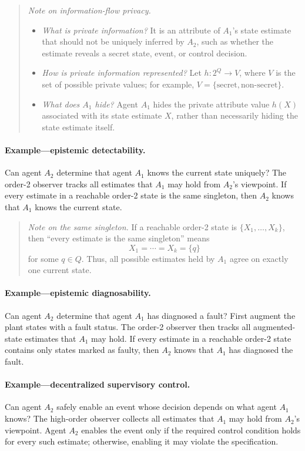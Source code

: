 \documentclass[11pt]{article}
\begin{document}
\begin{quote}
\textit{Note on information-flow privacy.}
\begin{itemize}
\item \textit{What is private information?} It is an attribute of $A_1$'s state estimate that should not be uniquely inferred by $A_2$, such as whether the estimate reveals a secret state, event, or control decision.
\item \textit{How is private information represented?} Let $h:2^Q\rightarrow V$, where $V$ is the set of possible private values; for example, $V=\{\text{secret},\text{non-secret}\}$.
\item \textit{What does $A_1$ hide?} Agent $A_1$ hides the private attribute value $h(X)$ associated with its state estimate $X$, rather than necessarily hiding the state estimate itself.
\end{itemize}
\end{quote}

\paragraph{Example---epistemic detectability.}
Can agent $A_2$ determine that agent $A_1$ knows the current state uniquely? The order-2 observer tracks all estimates that $A_1$ may hold from $A_2$'s viewpoint. If every estimate in a reachable order-2 state is the same singleton, then $A_2$ knows that $A_1$ knows the current state.

\begin{quote}
\textit{Note on the same singleton.}
If a reachable order-2 state is $\{X_1,\ldots,X_k\}$, then ``every estimate is the same singleton'' means
\[
X_1=\cdots=X_k=\{q\}
\]
for some $q\in Q$. Thus, all possible estimates held by $A_1$ agree on exactly one current state.
\end{quote}

\paragraph{Example---epistemic diagnosability.}
Can agent $A_2$ determine that agent $A_1$ has diagnosed a fault? First augment the plant states with a fault status. The order-2 observer then tracks all augmented-state estimates that $A_1$ may hold. If every estimate in a reachable order-2 state contains only states marked as faulty, then $A_2$ knows that $A_1$ has diagnosed the fault.

\paragraph{Example---decentralized supervisory control.}
Can agent $A_2$ safely enable an event whose decision depends on what agent $A_1$ knows? The high-order observer collects all estimates that $A_1$ may hold from $A_2$'s viewpoint. Agent $A_2$ enables the event only if the required control condition holds for every such estimate; otherwise, enabling it may violate the specification.
\end{document}
